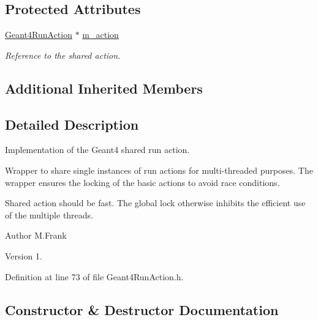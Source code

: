 \subsection*{Protected Attributes}
\begin{DoxyCompactItemize}
\item 
\hyperlink{class_d_d4hep_1_1_simulation_1_1_geant4_run_action}{Geant4\+Run\+Action} $\ast$ \hyperlink{class_d_d4hep_1_1_simulation_1_1_geant4_shared_run_action_a2d197cf997162e46c7dc5aa51c46a6c7}{m\+\_\+action}
\begin{DoxyCompactList}\small\item\em Reference to the shared action. \end{DoxyCompactList}\end{DoxyCompactItemize}
\subsection*{Additional Inherited Members}


\subsection{Detailed Description}
Implementation of the Geant4 shared run action. 

Wrapper to share single instances of run actions for multi-\/threaded purposes. The wrapper ensures the locking of the basic actions to avoid race conditions.

Shared action should be \textquotesingle{}fast\textquotesingle{}. The global lock otherwise inhibits the efficient use of the multiple threads.

\begin{DoxyAuthor}{Author}
M.\+Frank 
\end{DoxyAuthor}
\begin{DoxyVersion}{Version}
1. 
\end{DoxyVersion}


Definition at line 73 of file Geant4\+Run\+Action.\+h.



\subsection{Constructor \& Destructor Documentation}
\hypertarget{class_d_d4hep_1_1_simulation_1_1_geant4_shared_run_action_a2d1a2043768ca1aff6aef303ad32b473}{}\label{class_d_d4hep_1_1_simulation_1_1_geant4_shared_run_action_a2d1a2043768ca1aff6aef303ad32b473} 
